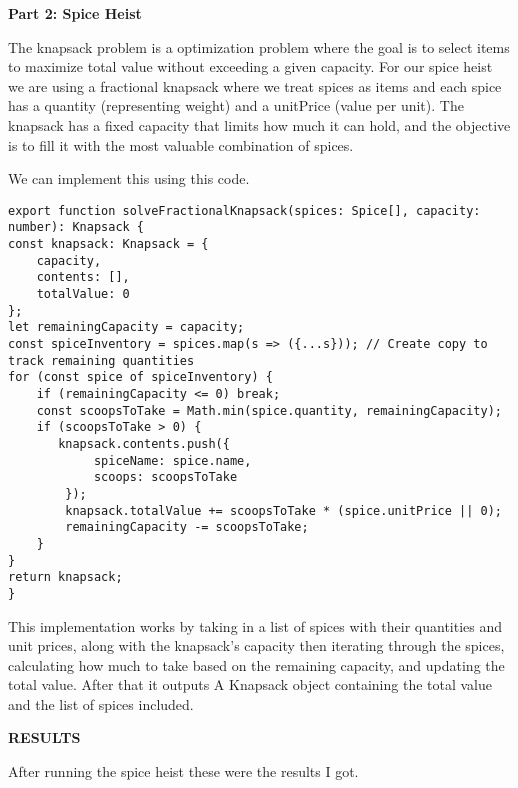 \documentclass[12pt,letterpaper, onecolumn]{exam}
\begin{document}
\newpage

\noindent \textbf{Part 2: Spice Heist }

\vspace{.3cm}

The knapsack problem is a optimization problem where the goal is to select items to maximize total value without exceeding a given capacity. For our spice heist we are using a fractional knapsack where we treat spices as items and each spice has a quantity (representing weight) and a unitPrice (value per unit).
\vspace{.2cm}
The knapsack has a fixed capacity that limits how much it can hold, and the objective is to fill it with the most valuable combination of spices. 

\vspace{.3cm}
\centering We can implement this using this code. 

\vspace{.3cm}

\begin{lstlisting}
export function solveFractionalKnapsack(spices: Spice[], capacity: number): Knapsack {
const knapsack: Knapsack = {
    capacity,
    contents: [],
    totalValue: 0
};
let remainingCapacity = capacity;
const spiceInventory = spices.map(s => ({...s})); // Create copy to track remaining quantities
for (const spice of spiceInventory) {
    if (remainingCapacity <= 0) break;
    const scoopsToTake = Math.min(spice.quantity, remainingCapacity);
    if (scoopsToTake > 0) {
       knapsack.contents.push({
            spiceName: spice.name,
            scoops: scoopsToTake
        });
        knapsack.totalValue += scoopsToTake * (spice.unitPrice || 0);
        remainingCapacity -= scoopsToTake;
    }
}
return knapsack;
}
\end{lstlisting}

\vspace{.2cm}
\centering This implementation works by taking in a list of spices with their quantities and unit prices, along with the knapsack's capacity then iterating through the spices, calculating how much to take based on the remaining capacity, and updating the total value. After that it outputs A Knapsack object containing the total value and the list of spices included.

\newpage

\centering \textbf{RESULTS}

\vspace{.3cm}

\centering After running the spice heist these were the results I got.
\end{document}
